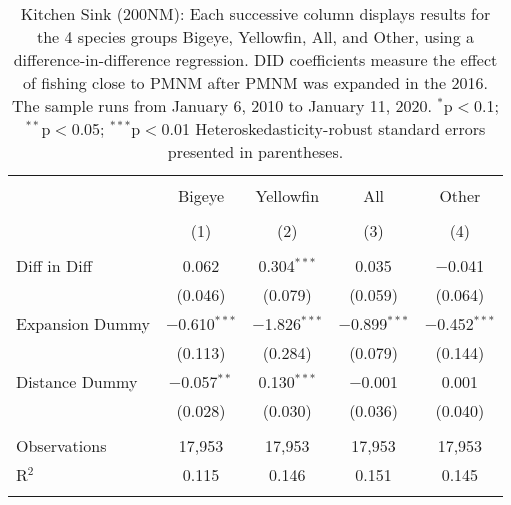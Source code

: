 
\begin{table}[!htbp] \centering 
  \caption{Kitchen Sink (200NM): Each successive column displays results for the 4 species groups Bigeye, Yellowfin, All, and Other, using a difference-in-difference regression. DID coefficients measure the effect of fishing close to PMNM after PMNM was expanded in the 2016. The sample runs from January 6, 2010 to January 11, 2020. $^{*}$p$<$0.1; $^{**}$p$<$0.05; $^{***}$p$<$0.01 Heteroskedasticity-robust standard errors presented in parentheses.} 
  \label{tbl:kitchenFE200NM} 
\begin{tabular}{@{\extracolsep{5pt}}lcccc} 
\\[-1.8ex]\hline 
\hline \\[-1.8ex] 
 & Bigeye & Yellowfin & All & Other \\ 
\\[-1.8ex] & (1) & (2) & (3) & (4)\\ 
\hline \\[-1.8ex] 
 Diff in Diff & 0.062 & 0.304$^{***}$ & 0.035 & $-$0.041 \\ 
  & (0.046) & (0.079) & (0.059) & (0.064) \\ 
  Expansion Dummy & $-$0.610$^{***}$ & $-$1.826$^{***}$ & $-$0.899$^{***}$ & $-$0.452$^{***}$ \\ 
  & (0.113) & (0.284) & (0.079) & (0.144) \\ 
  Distance Dummy & $-$0.057$^{**}$ & 0.130$^{***}$ & $-$0.001 & 0.001 \\ 
  & (0.028) & (0.030) & (0.036) & (0.040) \\ 
 \hline \\[-1.8ex] 
Observations & 17,953 & 17,953 & 17,953 & 17,953 \\ 
R$^{2}$ & 0.115 & 0.146 & 0.151 & 0.145 \\ 
\hline 
\hline \\[-1.8ex] 
\end{tabular} 
\end{table} 
